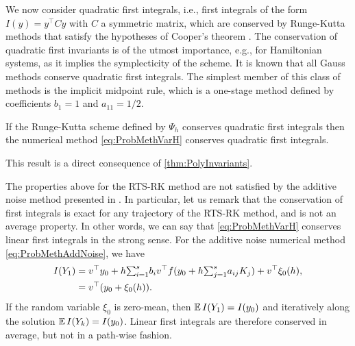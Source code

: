 \documentclass[final,onefignum,onetabnum]{siamonline171218}
\begin{document}
We now consider quadratic first integrals, i.e., first integrals of the form $I(y) = y^\top C y$ with $C$ a symmetric matrix, which are conserved by Runge-Kutta methods that satisfy the hypotheses of Cooper's theorem \cite{HLW06}. The conservation of quadratic first invariants is of the utmost importance, e.g., for Hamiltonian systems, as it implies the symplecticity of the scheme. It is known \cite{HLW06} that all Gauss methods conserve quadratic first integrals. The simplest member of this class of methods is the implicit midpoint rule, which is a one-stage method defined by coefficients $b_1 = 1$ and $a_{11} = 1/2$.
\begin{corollary}\label{thm:QuadraticInvariants} If the Runge-Kutta scheme defined by $\Psi_h$ conserves quadratic first integrals then the numerical method \eqref{eq:ProbMethVarH} conserves quadratic first integrals.
\end{corollary}
This result is a direct consequence of \cref{thm:PolyInvariants}.

The properties above for the RTS-RK method are not satisfied by the additive noise method presented in \cite{CGS16}. In particular, let us remark that the conservation of first integrals is exact for any trajectory of the RTS-RK method, and is not an average property. In other words, we can say that \eqref{eq:ProbMethVarH} conserves linear first integrals in the strong sense. For the additive noise numerical method \eqref{eq:ProbMethAddNoise}, we have
\begin{equation}
	\begin{aligned}
	I(Y_1) &= v^\top  y_0 + h {\textstyle\sum}_{i=1}^s b_iv^\top  f(y_0 + h{\textstyle\sum}_{j=1}^{s} a_{ij}K_j) + v^\top  \xi_0(h), \\
	&= v^\top  (y_0 + \xi_0(h)).
	\end{aligned}
\end{equation}
If the random variable $\xi_0$ is zero-mean, then $\operatorname{\mathbb{E}} I(Y_1) = I(y_0)$ and iteratively along the solution $\operatorname{\mathbb{E}} I(Y_k) = I(y_0)$. Linear first integrals are therefore conserved in average, but not in a path-wise fashion.
\end{document}
